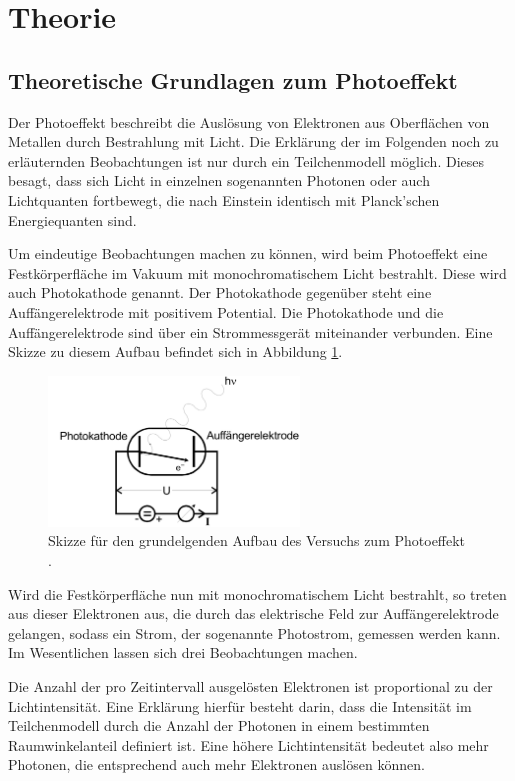 \section{Theorie}
\label{sec:Theorie}

\subsection{Theoretische Grundlagen zum Photoeffekt}
\label{subsec:Theorie_Photoeffekt}

Der Photoeffekt beschreibt die Auslösung von Elektronen aus Oberflächen von Metallen
durch Bestrahlung mit Licht. Die Erklärung der im Folgenden noch zu erläuternden
Beobachtungen ist nur durch ein Teilchenmodell möglich. Dieses besagt, dass sich
Licht in einzelnen sogenannten Photonen oder auch Lichtquanten fortbewegt, die nach
Einstein identisch mit Planck'schen Energiequanten sind.

Um eindeutige Beobachtungen machen zu können, wird beim Photoeffekt eine Festkörperfläche
im Vakuum mit monochromatischem Licht bestrahlt. Diese wird auch Photokathode genannt.
Der Photokathode gegenüber steht eine Auffängerelektrode mit positivem Potential.
Die Photokathode und die Auffängerelektrode sind über ein Strommessgerät miteinander verbunden.
Eine Skizze zu diesem Aufbau befindet sich in Abbildung \ref{fig:photoeffekt_skizze}.

\begin{figure}
  \centering
  \includegraphics[height=4cm]{data/photoeffekt_skizze.png}
  \caption{Skizze für den grundelgenden Aufbau des Versuchs zum Photoeffekt \cite{Versuchsanleitung}.}
  \label{fig:photoeffekt_skizze}
\end{figure}

Wird die Festkörperfläche nun mit monochromatischem Licht bestrahlt, so treten aus dieser
Elektronen aus, die durch das elektrische Feld zur Auffängerelektrode gelangen, sodass
ein Strom, der sogenannte Photostrom, gemessen werden kann. Im Wesentlichen lassen
sich drei Beobachtungen machen.

Die Anzahl der pro Zeitintervall ausgelösten Elektronen ist proportional zu der
Lichtintensität. Eine Erklärung hierfür besteht darin, dass die Intensität im Teilchenmodell
durch die Anzahl der Photonen in einem bestimmten Raumwinkelanteil definiert ist.
Eine höhere Lichtintensität bedeutet also mehr Photonen, die entsprechend auch mehr
Elektronen auslösen können.


